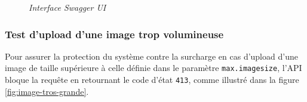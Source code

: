 \documentclass[12pt,a4paper]{report}
\begin{document}
	\begin{figure}[H]
		\centering
		\caption{\textit{Interface Swagger UI}}
		\label{fig:swagger-ui}
	\end{figure}
	
	\subsubsection{Test d'upload d'une image trop volumineuse}
	
	Pour assurer la protection du système contre la surcharge en cas d'upload d'une image de taille supérieure à celle définie dans le paramètre \verb|max.imagesize|, l'API bloque la requête en retournant le code d'état \verb|413|, comme illustré dans la figure \ref{fig:image-tros-grande}.
	
\end{document}
